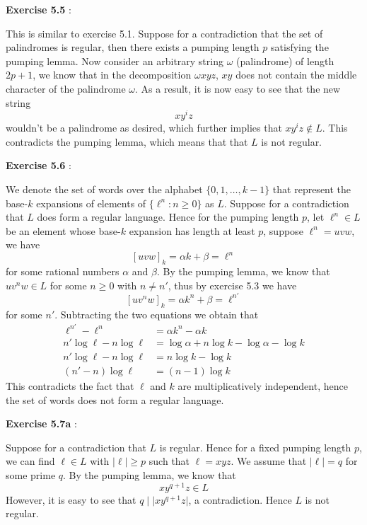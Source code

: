 \documentclass{article}
\newenvironment{solution}[1][\proofname]{
    \proof[\textbf{Solution:}] \renewcommand{\qedsymbol}{$\bell$}
}{\endproof}
\begin{document}
\noindent \textbf{Exercise 5.5} \label{exercise5.5}: 

\begin{solution}
    This is similar to exercise 5.1. Suppose for a contradiction that the set of palindromes is regular, then there exists a pumping length $p$ satisfying the pumping lemma. Now consider an arbitrary string $\omega$ (palindrome) of length $2p + 1$, we know that in the decomposition $\omega xyz$, $xy$ does not contain the middle character of the palindrome $\omega$. As a result, it is now easy to see that the new string 
    \[ x y^i z \]
    wouldn't be a palindrome as desired, which further implies that $x y^i z \notin L$. This contradicts the pumping lemma, which means that that $L$ is not regular. 
\end{solution}

\noindent \textbf{Exercise 5.6} : 

\begin{solution}
    We denote the set of words over the alphabet $\{0, 1, \ldots, k-1\}$ that represent the base-$k$ expansions of elements of $\{\ell^n : n \geq 0\}$ as $L$. Suppose for a contradiction that $L$ does form a regular language. Hence for the pumping length $p$, let $\ell^n \in L$ be an element whose base-$k$ expansion has length at least $p$, suppose $\ell^n = uvw$, we have 
    \[ [uvw]_k = \alpha k + \beta = \ell^n \]
    for some rational numbers $\alpha$ and $\beta$. By the pumping lemma, we know that $uv^nw \in L$ for some $n \geq 0$ with $n \neq n'$, thus by exercise 5.3 we have 
    \[ [uv^nw]_k = \alpha k^n + \beta = \ell^{n'} \]
    for some $n'$. Subtracting the two equations we obtain that 
    \begin{align*}
        \ell^{n'} - \ell^n & = \alpha k^n - \alpha k \\ 
        n' \log \ell - n \log \ell & = \log \alpha + n \log k - \log \alpha - \log k \\ 
        n' \log \ell - n \log \ell & = n \log k - \log k \\ 
        (n' - n) \log \ell & = (n - 1) \log k
    \end{align*}
    This contradicts the fact that $\ell$ and $k$ are multiplicatively independent, hence the set of words does not form a regular language.  
\end{solution}

\noindent \textbf{Exercise 5.7a} : 

\begin{solution}
    Suppose for a contradiction that $L$ is regular. Hence for a fixed pumping length $p$, we can find $\ell \in L$ with $|\ell| \geq p$ such that $\ell = xyz$. We assume that $|\ell| = q$ for some prime $q$. By the pumping lemma, we know that 
    \[ x y^{q + 1} z \in L \]
    However, it is easy to see that $q \;|\; | xy^{q+1}z |$, a contradiction. Hence $L$ is not regular. 
\end{solution}
\end{document}
